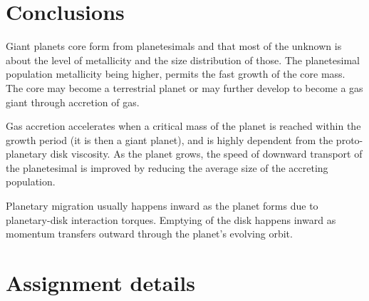 \documentclass[12pt]{article} %
\begin{document}
\section{Conclusions}\vspace{-2ex}\titlerule[1pt]\bigskip

Giant planets core form from planetesimals and that most of the unknown is about the level of metallicity and the size distribution of those. The planetesimal population metallicity being higher, permits the fast growth of the core mass. The core may become a terrestrial planet or may further develop to become a gas giant through accretion of gas.\newline

\noindent Gas accretion accelerates when a critical mass of the planet is reached within the growth period (it is then a giant planet), and is highly dependent from the proto-planetary disk viscosity. As the planet grows, the speed of downward transport of the planetesimal is improved by reducing the average size of the accreting population.\newline

\noindent Planetary migration usually happens inward as the planet forms due to planetary-disk interaction torques. Emptying of the disk happens inward as momentum transfers outward through the planet's evolving orbit.

\section{Assignment details}\vspace{-2ex}\titlerule[1pt]\bigskip
\end{document}
